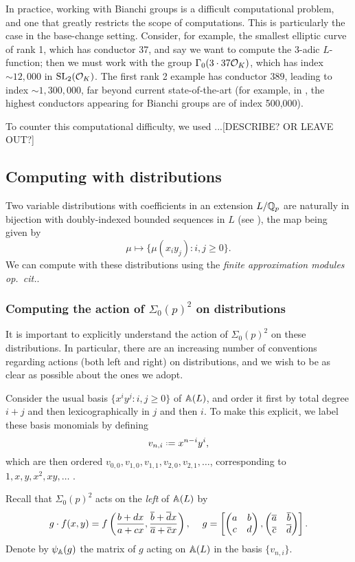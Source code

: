 \documentclass[a4paper,11pt]{article}
\numberwithin{equation}{section}
\begin{document}
In practice, working with Bianchi groups is a difficult computational problem, and one that greatly restricts the scope of computations. This is particularly the case in the base-change setting. Consider, for example, the smallest elliptic curve of rank 1, which has conductor 37, and say we want to compute the $3$-adic $L$-function; then we must work with the group $\Gamma_0(3\cdot 37\mathcal{O}_K)$, which has index $\sim 12,000$ in $\mathrm{SL}_2(\mathcal{O}_K)$. The first rank 2 example has conductor $389$, leading to index $\sim 1,300,000$, far beyond current state-of-the-art (for example, in \cite{LMFDB}, the highest conductors appearing for Bianchi groups are of index 500,000).

To counter this computational difficulty, we used ...[DESCRIBE? OR LEAVE OUT?]



\subsection{Computing with distributions}
Two variable distributions with coefficients in an extension $L/\mathbb{Q}_p$ are naturally in bijection with doubly-indexed bounded sequences in $L$ (see \cite[Proposition 3.6]{Wil17}), the map being given by
\[
 \mu \mapsto \{\mu(x_iy_j) : i,j \geq 0\}.
\]
We can compute with these distributions using the \emph{finite approximation modules} \emph{op.\ cit.}.

\subsubsection{Computing the action of \texorpdfstring{$\Sigma_0(p)^2$}{S0(p)2} on distributions}

It is important to explicitly understand the action of $\Sigma_0(p)^2$ on these distributions. In particular, there are an increasing number of conventions regarding actions (both left and right) on distributions, and we wish to be as clear as possible about the ones we adopt.
\begin{definition}
Consider the usual basis $\{x^iy^j : i,j \geq 0\}$ of $\mathbb{A}(L)$, and order it first by total degree $i+j$ and then lexicographically in $j$ and then $i$. To make this explicit, we label these basis monomials by defining
\[
	v_{n,i} \defeq x^{n-i}y^{i},
 \]
which are then ordered $v_{0,0}, v_{1,0},v_{1,1},v_{2,0},v_{2,1},\dots$, corresponding to $1,x,y,x^2,xy,\dots$ .
\end{definition}
Recall that $\Sigma_0(p)^2$ acts on the \emph{left} of $\mathbb{A}(L)$ by
\[
	g \cdot f(x,y) = f\left(\frac{b+dx}{a+cx},\frac{\overline{b}+\overline{d}x}{\overline{a} + \overline{c}x}\right), \hspace{12pt} g = \left[\begin{pmatrix}a & b\\c & d\end{pmatrix},\begin{pmatrix}\overline{a} & \overline{b}\\\overline{c} & \overline{d}\end{pmatrix}\right].
\]
Denote by $\psi_{\mathbb{A}}(g)$ the matrix of $g$ acting on $\mathbb{A}(L)$ in the basis $
\{v_{n,i}\}$.
\end{document}
